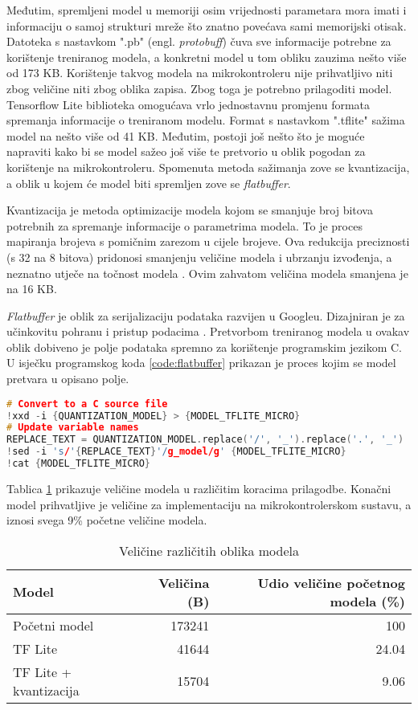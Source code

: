 Međutim, spremljeni model u memoriji osim vrijednosti parametara mora imati i informaciju 
o samoj strukturi mreže što znatno povećava sami memorijski otisak. Datoteka s nastavkom
".pb" (engl. \textit{protobuff}) čuva sve informacije potrebne za korištenje treniranog modela,
a konkretni model u tom obliku zauzima nešto više od 173 KB. Korištenje takvog modela
na mikrokontroleru nije prihvatljivo niti zbog veličine niti zbog oblika zapisa. Zbog 
toga je potrebno prilagoditi model. Tensorflow Lite biblioteka omogućava vrlo jednostavnu
promjenu formata spremanja informacije o treniranom modelu. Format s nastavkom ".tflite"
sažima model na nešto više od 41 KB. Međutim, postoji još nešto što je moguće napraviti
kako bi se model sažeo još više te pretvorio u oblik pogodan za korištenje na
mikrokontroleru. Spomenuta metoda sažimanja zove se kvantizacija, a oblik u kojem će model
biti spremljen zove se \textit{flatbuffer}.

Kvantizacija je metoda optimizacije modela kojom se smanjuje broj bitova potrebnih za
spremanje informacije o parametrima modela. 
To je proces mapiranja brojeva s pomičnim zarezom u cijele brojeve.
Ova redukcija preciznosti (s 32 na 8 bitova)
pridonosi smanjenju veličine modela i ubrzanju izvođenja, a neznatno utječe na točnost
modela \cite{quantization}. Ovim zahvatom veličina modela smanjena je na 16 KB. 

\textit{Flatbuffer} je oblik za serijalizaciju podataka razvijen u Googleu. Dizajniran je
za učinkovitu pohranu i pristup podacima \cite{flatbuffers_docs}. 
Pretvorbom treniranog modela u ovakav oblik
dobiveno je polje podataka spremno za korištenje programskim jezikom C.
U isječku programskog koda \ref{code:flatbuffer} prikazan je proces kojim se model pretvara u opisano 
polje.

\begin{lstlisting}[language=C++, caption=Pretvorba u Flatbuffer, label=code:flatbuffer]
# Convert to a C source file
!xxd -i {QUANTIZATION_MODEL} > {MODEL_TFLITE_MICRO}
# Update variable names
REPLACE_TEXT = QUANTIZATION_MODEL.replace('/', '_').replace('.', '_')
!sed -i 's/'{REPLACE_TEXT}'/g_model/g' {MODEL_TFLITE_MICRO}
!cat {MODEL_TFLITE_MICRO}
\end{lstlisting}

Tablica \ref{tab:model_sizes} prikazuje veličine modela u različitim koracima prilagodbe.
Konačni model prihvatljive je veličine za implementaciju na mikrokontrolerskom sustavu, 
a iznosi svega 9\% početne veličine modela.

\begin{table}[htb]
    \centering
    \begin{tabular}{|l|r|r|}
        \hline
        \textbf{Model} & \textbf{Veličina (B)} & \textbf{Udio veličine početnog modela (\%)} \\ \hline
        Početni model & 173241 & 100 \\ \hline
        TF Lite & 41644 & 24.04 \\ \hline
        TF Lite + kvantizacija & 15704 & 9.06 \\ \hline
    \end{tabular}
    \caption{Veličine različitih oblika modela}
    \label{tab:model_sizes}
\end{table}
